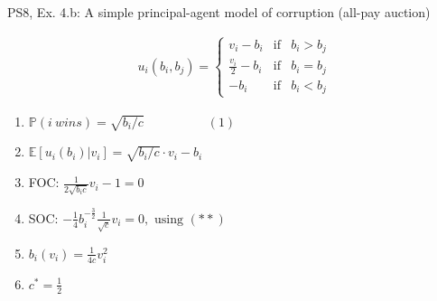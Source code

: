 \begin{frame}{PS8, Ex. 4.b: A simple principal-agent model of corruption (all-pay auction)}
\begin{multicols}{2}
\begin{align*}
        u_i(b_i,b_j)=\left\{\begin{array}{lcl}
          v_i-b_i           & \text{if} & b_i>b_j \\
          \frac{v_i}{2}-b_i & \text{if} & b_i=b_j \\
          -b_i              & \text{if} & b_i<b_j
        \end{array}\right.
      \end{align*} \vspace{-16pt}
      \begin{enumerate}
        \item $\mathbb{P}(i\ wins)=\sqrt{b_i/c}\quad\quad\quad\quad\quad(1)$
        \item $\mathbb{E}[u_i(b_i)|v_i]=\sqrt{b_i/c}\cdot v_i-b_i$
        \item FOC: $\frac{1}{2\sqrt{b_ic}}v_i-1=0$
        \item[] SOC: $-\frac{1}{4}b_i^{-\frac{3}{2}}\frac{1}{\sqrt{c}}v_i=0,\text{ using }(**)$
        \item $b_i(v_i)=\frac{1}{4c}v_i^2$
        \item $c^*=\frac{1}{2}$
      \end{enumerate}
      \vfill\null
    \end{multicols}
\end{frame}
